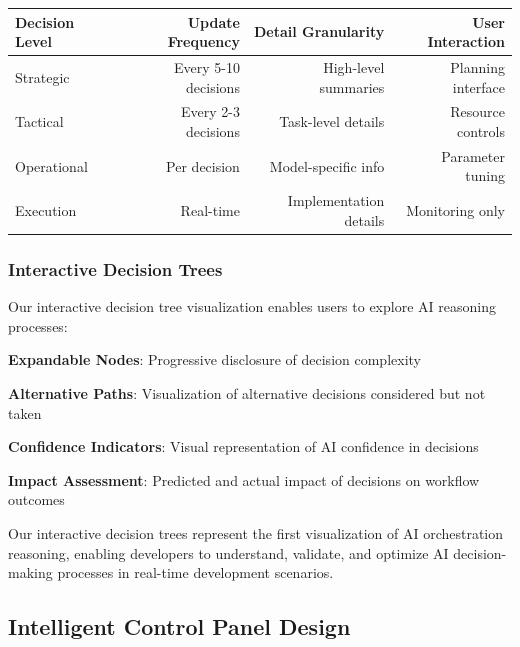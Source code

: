 \begin{center}
\begin{tabular}{@{}lrrr@{}}
\toprule
\textbf{Decision Level} & \textbf{Update Frequency} & \textbf{Detail Granularity} & \textbf{User Interaction} \\
\midrule
Strategic & Every 5-10 decisions & High-level summaries & Planning interface \\
Tactical & Every 2-3 decisions & Task-level details & Resource controls \\
Operational & Per decision & Model-specific info & Parameter tuning \\
Execution & Real-time & Implementation details & Monitoring only \\
\bottomrule
\end{tabular}
\end{center}

\subsubsection*{Interactive Decision Trees}

Our interactive decision tree visualization enables users to explore AI reasoning processes:

\begin{compactlist}
    \item \textbf{Expandable Nodes}: Progressive disclosure of decision complexity
    \item \textbf{Alternative Paths}: Visualization of alternative decisions considered but not taken
    \item \textbf{Confidence Indicators}: Visual representation of AI confidence in decisions
    \item \textbf{Impact Assessment}: Predicted and actual impact of decisions on workflow outcomes
\end{compactlist}

\begin{infobox}[title=Decision Tree Innovation]
Our interactive decision trees represent the first visualization of AI orchestration reasoning, enabling developers to understand, validate, and optimize AI decision-making processes in real-time development scenarios.
\end{infobox}

\subsection*{Intelligent Control Panel Design}


